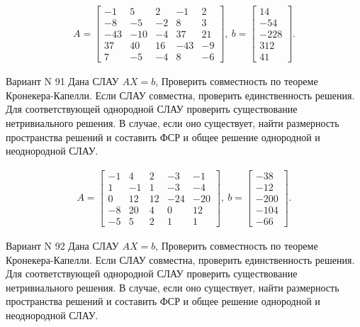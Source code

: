 \documentclass[11pt]{report}
\begin{document}
\begin{align*}
 A = \left[\begin{matrix}-1 & 5 & 2 & -1 & 2\\-8 & -5 & -2 & 8 & 3\\-43 & -10 & -4 & 37 & 21\\37 & 40 & 16 & -43 & -9\\7 & -5 & -4 & 8 & -6\end{matrix}\right],
\ b = \left[\begin{matrix}14\\-54\\-228\\312\\41\end{matrix}\right]. 
 \end{align*}

Вариант N 91
Дана СЛАУ $AX = b$,
Проверить совместность по теореме Кронекера-Капелли. Если СЛАУ совместна, проверить единственность решения.
Для соответствующей однородной СЛАУ проверить существование нетривиального решения. В случае, если оно существует,
найти размерность пространства решений и составить ФСР и общее решение однородной  и неоднородной СЛАУ.


\begin{align*}
 A = \left[\begin{matrix}-1 & 4 & 2 & -3 & -1\\1 & -1 & 1 & -3 & -4\\0 & 12 & 12 & -24 & -20\\-8 & 20 & 4 & 0 & 12\\-5 & 5 & 2 & 1 & 1\end{matrix}\right],
\ b = \left[\begin{matrix}-38\\-12\\-200\\-104\\-66\end{matrix}\right]. 
 \end{align*}

Вариант N 92
Дана СЛАУ $AX = b$,
Проверить совместность по теореме Кронекера-Капелли. Если СЛАУ совместна, проверить единственность решения.
Для соответствующей однородной СЛАУ проверить существование нетривиального решения. В случае, если оно существует,
найти размерность пространства решений и составить ФСР и общее решение однородной  и неоднородной СЛАУ.
\end{document}
